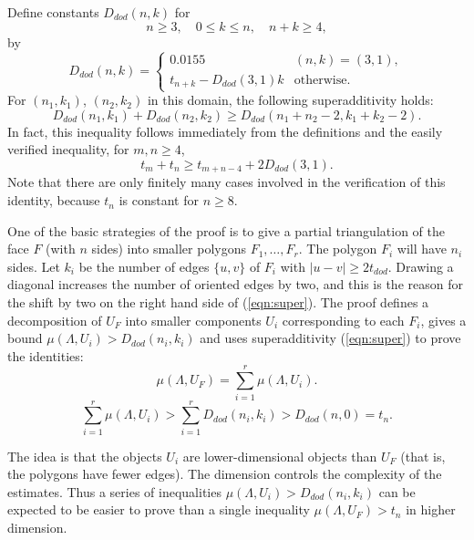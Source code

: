 \documentclass{article} %
\begin{document}
Define constants $D_{dod}(n,k)$ for
  $$
  n \ge 3,\quad 0\le k \le n,\quad n+k\ge 4,
  $$
by
   $$
   D_{dod}(n,k) =\begin{cases} 0.0155 & (n,k) = (3,1),\\
     t_{n+k} - D_{dod}(3,1)k & \text{otherwise}.
    \end{cases}
   $$
For $(n_1,k_1)$, $(n_2,k_2)$ in this domain,
the following superadditivity holds:
\begin{equation}\label{eqn:super}
  D_{dod}(n_1,k_1) + D_{dod}(n_2,k_2) \ge D_{dod}(n_1+n_2-2,k_1+k_2-2).
\end{equation}
In fact, this inequality follows immediately from the definitions and the
easily verified inequality,
for $m,n\ge 4$,
$$
t_m + t_n \ge t_{m+n-4} + 2 D_{dod}(3,1).
$$
Note that there are only finitely many cases involved in the
verification of this identity,
because $t_n$ is constant for $n\ge 8$.


One of the basic strategies of the proof is to give a partial triangulation
of the face $F$ (with $n$ sides)
into smaller polygons $F_1,\ldots,F_r$.   The polygon
$F_i$ will have $n_i$ sides.  Let %
$k_i$ be the number of edges $\{u,v\}$ of $F_i$ with $|u-v|\ge 2t_{dod}$.
Drawing a diagonal increases the number of oriented edges by
two, and this is the reason for the shift by two on the right
hand side of (\ref{eqn:super}).   The proof defines
a decomposition of $U_F$ into smaller components $U_i$ corresponding
to each $F_i$, gives a bound $\mu(\Lambda,U_i) > D_{dod}(n_i,k_i)$
and uses superadditivity (\ref{eqn:super}) to prove the identities:
\begin{equation}\label{eqn:mu}
  \mu(\Lambda,U_F) = \sum_{i=1}^r \mu(\Lambda,U_i).
\end{equation}
\begin{equation}\label{eqn:super-mu}
\sum_{i=1}^r \mu(\Lambda,U_i) > \sum_{i=1}^r D_{dod}(n_i,k_i)
 > D_{dod}(n,0) = t_n.
\end{equation}

The idea is that the objects $U_i$ are lower-dimensional objects
than $U_F$ (that is, the polygons  have fewer edges).
The dimension controls the complexity
of the estimates.  Thus a series of inequalities $\mu(\Lambda,U_i) > D_{dod}(n_i,k_i)$
can be expected to be easier to prove than a single inequality
$\mu(\Lambda,U_F) > t_n$ in higher dimension.  
\end{document}
